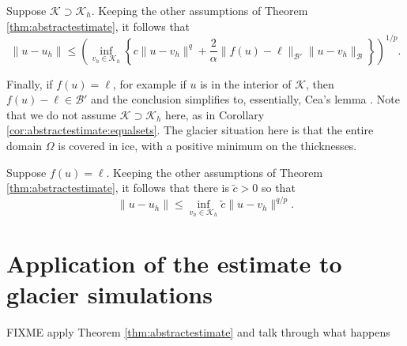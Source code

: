 \documentclass[hidelinks,onefignum,onetabnum,final]{siamart220329}  %
\newcommand{\cB}{\mathcal{B}}
\newcommand{\cK}{\mathcal{K}}
\begin{document}
\begin{corollary}  \label{cor:abstractestimate:equalsets}
Suppose $\cK \supset \cK_h$.  Keeping the other assumptions of Theorem \ref{thm:abstractestimate}, it follows that
\begin{equation}
\|u-u_h\| \le \left(\inf_{v_h\in\cK_h} \left\{c \|u - v_h\|^q + \frac{2}{\alpha} \|f(u)-\ell\|_{\cB'} \|u-v_h\|_{\cB}\right\}\right)^{1/p}. \label{eq:abstractestimate:equalsets}
\end{equation}
\end{corollary}

Finally, if $f(u)=\ell$, for example if $u$ is in the interior of $\cK$, then $f(u)-\ell \in \cB'$ and the conclusion simplifies to, essentially, Cea's lemma \cite{Ciarlet2002}.  Note that we do not assume $\cK \supset \cK_h$ here, as in Corollary \ref{cor:abstractestimate:equalsets}.  The glacier situation here is that the entire domain $\Omega$ is covered in ice, with a positive minimum on the thicknesses.

\begin{corollary}  \label{cor:abstractestimate:interior}
Suppose $f(u)=\ell$.  Keeping the other assumptions of Theorem \ref{thm:abstractestimate}, it follows that there is $\tilde c>0$ so that
\begin{equation}
\|u-u_h\| \le \inf_{v_h\in\cK_h} \tilde c \|u - v_h\|^{q/p}. \label{eq:abstractestimate:interior}
\end{equation}
\end{corollary}




\section{Application of the estimate to glacier simulations} \label{sec:application}

FIXME apply Theorem \ref{thm:abstractestimate} and talk through what happens




\end{document}
